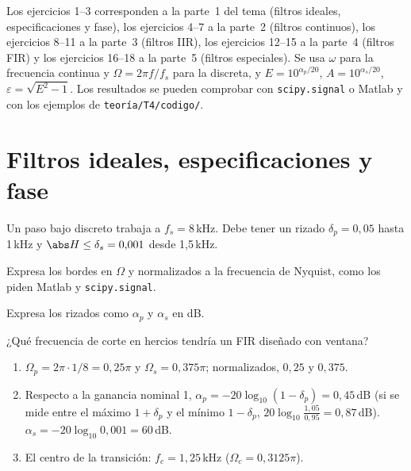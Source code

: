 \documentclass[11pt,a4paper]{scrartcl}
\begin{document}
\ifsoluciones{}\else{}\fi

Los ejercicios 1–3 corresponden a la parte~1 del tema (filtros ideales, especificaciones y fase), los ejercicios 4–7 a la parte~2 (filtros continuos), los ejercicios 8–11 a la parte~3 (filtros IIR), los ejercicios 12–15 a la parte~4 (filtros FIR) y los ejercicios 16–18 a la parte~5 (filtros especiales). Se usa $\omega$ para la frecuencia continua y $\Omega=2\pi f/f_s$ para la discreta, y $E=10^{\alpha_p/20}$, $A=10^{\alpha_s/20}$, $\varepsilon=\sqrt{E^2-1}$. Los resultados se pueden comprobar con \texttt{scipy.signal} o Matlab y con los ejemplos de \texttt{teoría/T4/codigo/}.

\section*{Filtros ideales, especificaciones y fase}

\begin{ejercicio}
  Un paso bajo discreto trabaja a $f_s=8$\,kHz. Debe tener un rizado $\delta_p=0{,}05$ hasta 1\,kHz y $\abs H\le\delta_s=0{,}001$ desde 1,5\,kHz.
  \begin{incisos}[1]
    \item Expresa los bordes en $\Omega$ y normalizados a la frecuencia de Nyquist, como los piden Matlab y \texttt{scipy.signal}.
    \item Expresa los rizados como $\alpha_p$ y $\alpha_s$ en dB.
    \item ¿Qué frecuencia de corte en hercios tendría un FIR diseñado con ventana?
  \end{incisos}
\end{ejercicio}
\begin{solucion}
  \begin{enumerate}[label=\alph*)]
    \item $\Omega_p=2\pi\cdot1/8=0{,}25\pi$ y $\Omega_s=0{,}375\pi$; normalizados, $0{,}25$ y $0{,}375$.
    \item Respecto a la ganancia nominal 1, $\alpha_p=-20\log_{10}(1-\delta_p)=0{,}45$\,dB (si se mide entre el máximo $1+\delta_p$ y el mínimo $1-\delta_p$, $20\log_{10}\frac{1{,}05}{0{,}95}=0{,}87$\,dB). $\alpha_s=-20\log_{10}0{,}001=60$\,dB.
    \item El centro de la transición: $f_c=1{,}25$\,kHz ($\Omega_c=0{,}3125\pi$).
  \end{enumerate}
\end{solucion}
\end{document}
